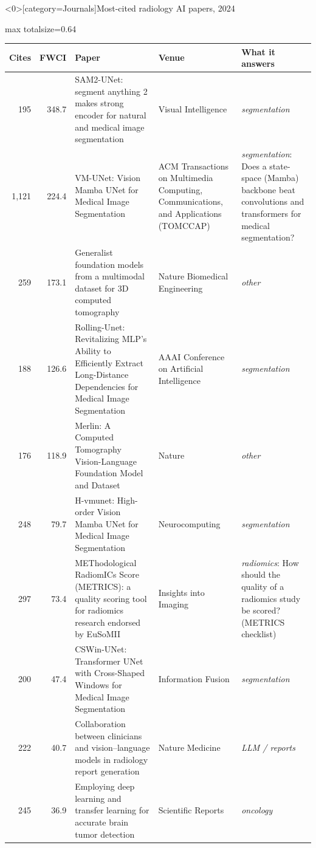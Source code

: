 \documentclass[aspectratio=169]{beamer}
\renewcommand{\arraystretch}{1.08}
\begin{document}
\begin{frame}<0>[category=Journals]{Most-cited radiology AI papers, 2024}
\tiny
\begin{adjustbox}{max totalsize={\textwidth}{0.64\textheight}}
\renewcommand{\arraystretch}{1.2}
\begin{tabular}{|r|r|>{\raggedright\arraybackslash}p{}|>{\raggedright\arraybackslash}p{}|>{\raggedright\arraybackslash}p{}|}
\hline \textbf{Cites} & \textbf{FWCI} & \textbf{Paper} & \textbf{Venue} & \textbf{What it answers} \\ \hline
195 & 348.7 & SAM2-UNet: segment anything 2 makes strong encoder for natural and medical image segmentation & Visual Intelligence & \textit{segmentation} \\ \hline
1,121 & 224.4 & VM-UNet: Vision Mamba UNet for Medical Image Segmentation & ACM Transactions on Multimedia Computing, Communications, and Applications (TOMCCAP) & \textit{segmentation}: Does a state-space (Mamba) backbone beat convolutions and transformers for medical segmentation? \\ \hline
259 & 173.1 & Generalist foundation models from a multimodal dataset for 3D computed tomography & Nature Biomedical Engineering & \textit{other} \\ \hline
188 & 126.6 & Rolling-Unet: Revitalizing MLP's Ability to Efficiently Extract Long-Distance Dependencies for Medical Image Segmentation & AAAI Conference on Artificial Intelligence & \textit{segmentation} \\ \hline
176 & 118.9 & Merlin: A Computed Tomography Vision-Language Foundation Model and Dataset & Nature & \textit{other} \\ \hline
248 & 79.7 & H-vmunet: High-order Vision Mamba UNet for Medical Image Segmentation & Neurocomputing & \textit{segmentation} \\ \hline
297 & 73.4 & METhodological RadiomICs Score (METRICS): a quality scoring tool for radiomics research endorsed by EuSoMII & Insights into Imaging & \textit{radiomics}: How should the quality of a radiomics study be scored? (METRICS checklist) \\ \hline
200 & 47.4 & CSWin-UNet: Transformer UNet with Cross-Shaped Windows for Medical Image Segmentation & Information Fusion & \textit{segmentation} \\ \hline
222 & 40.7 & Collaboration between clinicians and vision--language models in radiology report generation & Nature Medicine & \textit{LLM / reports} \\ \hline
245 & 36.9 & Employing deep learning and transfer learning for accurate brain tumor detection & Scientific Reports & \textit{oncology} \\ \hline
\end{tabular}
\end{adjustbox}
\\[1pt]
{\tiny }
\end{frame}
\end{document}
